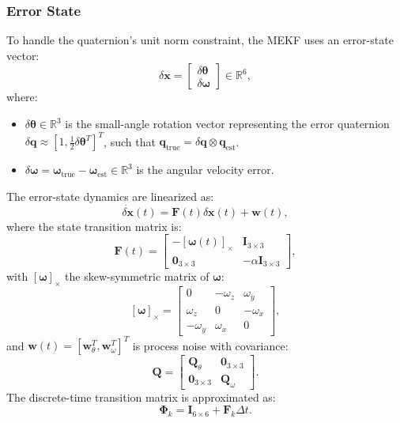 \documentclass[11pt]{article}
\begin{document}
\subsubsection{Error State}
To handle the quaternion’s unit norm constraint, the MEKF uses an error-state vector:
\[
\delta \mathbf{x} = \begin{bmatrix} \delta \boldsymbol{\theta} \\ \delta \boldsymbol{\omega} \end{bmatrix} \in \mathbb{R}^6,
\]
where:
\begin{itemize}
    \item \(\delta \boldsymbol{\theta} \in \mathbb{R}^3\) is the small-angle rotation vector representing the error quaternion \(\delta \mathbf{q} \approx [1, \frac{1}{2} \delta \boldsymbol{\theta}^T]^T\), such that \(\mathbf{q}_{\text{true}} = \delta \mathbf{q} \otimes \mathbf{q}_{\text{est}}\).
    \item \(\delta \boldsymbol{\omega} = \boldsymbol{\omega}_{\text{true}} - \boldsymbol{\omega}_{\text{est}} \in \mathbb{R}^3\) is the angular velocity error.
\end{itemize}
The error-state dynamics are linearized as:
\[
\dot{\delta \mathbf{x}}(t) = \mathbf{F}(t) \delta \mathbf{x}(t) + \mathbf{w}(t),
\]
where the state transition matrix is:
\[
\mathbf{F}(t) = \begin{bmatrix}
-[\boldsymbol{\omega}(t)]_{\times} & \mathbf{I}_{3 \times 3} \\
\mathbf{0}_{3 \times 3} & -\alpha \mathbf{I}_{3 \times 3}
\end{bmatrix},
\]
with \([\boldsymbol{\omega}]_{\times}\) the skew-symmetric matrix of \(\boldsymbol{\omega}\):
\[
[\boldsymbol{\omega}]_{\times} = \begin{bmatrix}
0 & -\omega_z & \omega_y \\
\omega_z & 0 & -\omega_x \\
-\omega_y & \omega_x & 0
\end{bmatrix},
\]
and \(\mathbf{w}(t) = [ \mathbf{w}_{\theta}^T, \mathbf{w}_{\omega}^T ]^T\) is process noise with covariance:
\[
\mathbf{Q} = \begin{bmatrix}
\mathbf{Q}_{\theta} & \mathbf{0}_{3 \times 3} \\
\mathbf{0}_{3 \times 3} & \mathbf{Q}_{\omega}
\end{bmatrix}.
\]
The discrete-time transition matrix is approximated as:
\[
\boldsymbol{\Phi}_k = \mathbf{I}_{6 \times 6} + \mathbf{F}_k \Delta t.
\]
\end{document}
